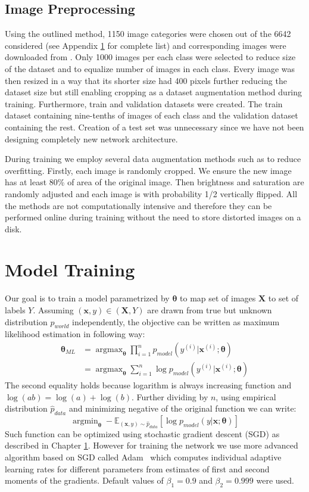 \subsection{Image Preprocessing}
Using the outlined method, 1150 image categories were chosen out of the 6642 considered (see Appendix \ref{} for complete list) and corresponding images were downloaded from \cite{ImageNetDownload}. Only 1000 images per each class were selected to reduce size of the dataset and to equalize number of images in each class. Every image was then resized in a way that its shorter size had 400 pixels further reducing the dataset size but still enabling cropping as a dataset augmentation method during training. Furthermore, train and validation datasets were created. The train dataset containing nine-tenths of images of each class and the validation dataset containing the rest. Creation of a test set was unnecessary since we have not been designing completely new network architecture.

During training we employ several data augmentation methods such as \cite{simard2003best} to reduce overfitting. Firstly, each image is randomly cropped. We ensure the new image has at least 80\% of area of the original image. Then brightness and saturation are randomly adjusted and each image is with probability 1/2 vertically flipped. All the methods are not computationally intensive and therefore they can be performed online during training without the need to store distorted images on a disk.


\section{Model Training}
Our goal is to train a model parametrized by $\bm{\theta}$ to map set of images $\bm{X}$ to set of labels $Y$. Assuming $(\bm{x},y)\in(\bm{X},Y)$ are drawn from true but unknown distribution $p_{world}$ independently, the objective can be written as maximum likelihood estimation in following way:
\begin{align}
\bm{\theta}_{ML} &=\mathop{\arg\max}_{\bm{\theta}}\prod\limits_{i=1}^{n} p_{model}\left(y^{(i)}|\bm{x}^{(i)};\bm{\theta}\right) \\
&=\mathop{\arg\max}_{\bm{\theta}}\sum\limits_{i=1}^{n} \log p_{model}\left(y^{(i)}|\bm{x}^{(i)};\bm{\theta}\right)
\end{align}
The second equality holds because logarithm is always increasing function and $\log(ab)=\log(a)+\log(b)$. Further dividing by $n$, using empirical distribution $\hat{p}_{data}$ and minimizing negative of the original function we can write:
\begin{equation}
\mathop{\arg\min}_{\bm{\theta}}-\mathbb{E}_{(\bm{x},y)\sim \hat{p}_{data}}\left[\log p_{model}\left(y|\bm{x};\bm{\theta}\right)\right]
\end{equation}
Such function can be optimized using stochastic gradient descent (SGD) as described in Chapter \ref{}. However for training the network we use more advanced algorithm based on SGD called Adam~\cite{adam} which computes individual adaptive learning rates for
different parameters from estimates of first and second moments of the gradients. Default values of $\beta_1 = 0.9$ and $\beta_2 = 0.999$ were used.

